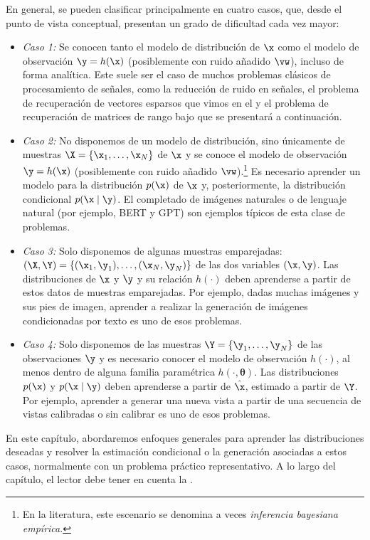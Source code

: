 \documentclass[../../book-main_es.tex]{subfiles}
\begin{document}
En general, se pueden clasificar principalmente en cuatro casos, que, 
desde el punto de vista conceptual, presentan un grado de dificultad cada vez mayor:
\begin{itemize}
    \item {\em Caso 1:} Se conocen tanto el modelo de distribución de $\x$ como
        el modelo de observación $\y = h(\x)$ (posiblemente con ruido añadido $\vw$),
        incluso de forma analítica. Este suele ser el
        caso de muchos problemas clásicos de procesamiento de señales, como
        la reducción de ruido en señales, el problema de recuperación de vectores esparsos que vimos
        en el  y el problema de recuperación de matrices de rango bajo
        que se presentará a continuación.
    \item {\em Caso 2:} No disponemos de un modelo de distribución,
        sino únicamente de muestras $\X = \{\x_1, \ldots, \x_N\}$ de $\x$ y
        se conoce el modelo de observación $\y = h(\x)$ (posiblemente con ruido añadido 
        $\vw$).\footnote{En la literatura, este escenario se denomina a veces
        {\em inferencia bayesiana empírica}.} Es necesario
        aprender un modelo para la distribución $p(\x)$ de $\x$ y,
        posteriormente, la distribución condicional
        $p(\x\mid \y)$. El completado de imágenes naturales o 
        de lenguaje natural (por ejemplo, BERT y GPT) son ejemplos típicos de esta
        clase de problemas.
    \item {\em Caso 3:} Solo disponemos de algunas muestras emparejadas: $(\X, \Y) =
        \{ (\x_1, \y_1), \ldots, (\x_N, \y_N) \}$ de las dos
        variables $(\x, \y)$. Las distribuciones de $\x$ y $\y$ y
        su relación $h(\cdot)$ deben aprenderse a partir de estos
        datos de muestras emparejadas. Por ejemplo, dadas muchas imágenes y sus
        pies de imagen, aprender a realizar la generación de imágenes
        condicionadas por texto es uno de esos problemas.
    \item {\em Caso 4:} Solo disponemos de las muestras $\Y = \{\y_1,
        \ldots, \y_N\}$ de las observaciones $\y$ y es necesario conocer el
        modelo de observación $h(\cdot)$, al menos dentro de alguna
        familia paramétrica $h(\cdot, \boldsymbol{\theta})$. Las
        distribuciones $p(\x)$ y $p(\x \mid \y)$ deben aprenderse
        a partir de $\hat \x$, estimado a partir de $\Y$. Por ejemplo, aprender a
        generar una nueva vista a partir de una secuencia de vistas calibradas o
        sin calibrar es uno de esos problemas.
\end{itemize}
En este capítulo, abordaremos enfoques generales para aprender las
distribuciones deseadas y resolver la estimación condicional
o la generación asociadas a estos casos, normalmente con un problema práctico
representativo. A lo largo del capítulo, el lector debe tener
en cuenta la .
\end{document}
